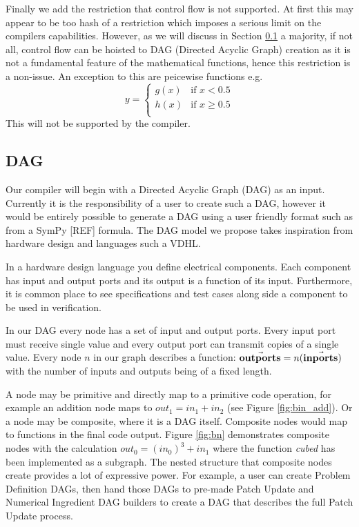 
Finally we add the restriction that control flow is not supported.
At first this may appear to be too hash of a restriction which imposes a serious limit on the compilers capabilities.
However, as we will discuss in Section \ref{sec:DAG} a majority, if not all, control flow can be hoisted to DAG (Directed Acyclic Graph) creation as it is not a fundamental feature of the mathematical functions, hence this restriction is a non-issue.
An exception to this are peicewise functions e.g.
\[
    y = \begin{cases} g(x)  & \text{if } x<0.5 \\  h(x)  & \text{if } x\geq 0.5 \\\end{cases}
\]
This will not be supported by the compiler.





\subsection{DAG} \label{sec:DAG}

Our compiler will begin with a Directed Acyclic Graph (DAG) as an input.
Currently it is the responsibility of a user to create such a DAG, however it would be entirely possible to generate a DAG using a user friendly format such as from a SymPy [REF] formula.
The DAG model we propose takes inspiration from hardware design and languages such a VDHL.

In a hardware design language you define electrical components.
Each component has input and output ports and its output is a function of its input.
Furthermore, it is common place to see specifications and test cases along side a component to be used in verification.

In our DAG every node has a set of input and output ports.
Every input port must receive single value and every output port can transmit copies of a single value.
Every node $n$ in our graph describes a function: $\vec{\mathbf{out ports}}=n(\vec{\mathbf{in ports}})$ with the number of inputs and outputs being of a fixed length.

A node may be primitive and directly map to a primitive code operation, for example an addition node maps to $out_1 = in_1 + in_2$ (see Figure \ref{fig:bin_add}).
Or a node may be composite, where it is a DAG itself.
Composite nodes would map to functions in the final code output.
Figure \ref{fig:bn} demonstrates composite nodes with the calculation $out_0 = (in_0)^3 + in_1$ where the function \textit{cubed} has been implemented as a subgraph.
The nested structure that composite nodes create provides a lot of expressive power.
For example, a user can create Problem Definition DAGs, then hand those DAGs to pre-made Patch Update and Numerical Ingredient DAG builders to create a DAG that describes the full Patch Update process.


